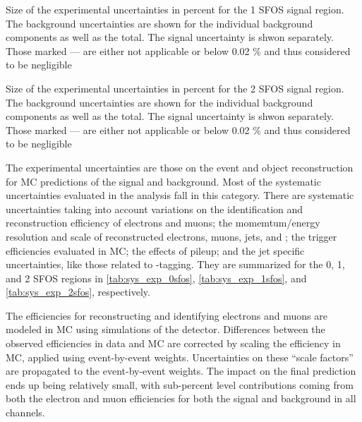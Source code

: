 \begin{table}[ht!]
\centering

\caption{Size of the experimental uncertainties in percent for the 1 SFOS signal region. The background uncertainties are shown for the individual background components as well as the total. The signal uncertainty is shwon separately. Those marked --- are either not applicable or below 0.02 \% and thus considered to be negligible}
\label{tab:sys_exp_1sfos}
\end{table}

\begin{table}[ht!]
\centering

\caption{Size of the experimental uncertainties in percent for the 2 SFOS signal region. The background uncertainties are shown for the individual background components as well as the total. The signal uncertainty is shwon separately. Those marked --- are either not applicable or below 0.02 \% and thus considered to be negligible}
\label{tab:sys_exp_2sfos}
\end{table}
The experimental uncertainties are those on the event and object
reconstruction for MC predictions of  the signal
and background.
Most of the systematic uncertainties evaluated in the analysis
fall in this category.
There are systematic uncertainties taking into account variations
on the identification and reconstruction
efficiency of electrons and muons; 
the momemtum/energy resolution and scale of reconstructed electrons, muons,
jets, and \MET; the trigger
efficiencies evaluated in MC; the effects of pileup; and the jet 
specific uncertainties, like those related to \bee-tagging.
They are summarized for the 0, 1, and 2 SFOS regions
in \tab\ref{tab:sys_exp_0sfos}, 
\tab\ref{tab:sys_exp_1sfos}, and
\tab\ref{tab:sys_exp_2sfos}, respectively.

The efficiencies for reconstructing and identifying electrons and muons
are modeled in MC using simulations of the detector. Differences
between the observed efficiencies in data and MC are corrected by scaling
the efficiency in MC, applied using event-by-event weights. 
Uncertainties on these ``scale factors'' are propagated to the event-by-event
weights.  The impact on the final prediction ends up being relatively
small, with sub-percent level contributions coming from both the electron
and muon efficiencies for both the signal and background in all channels.

